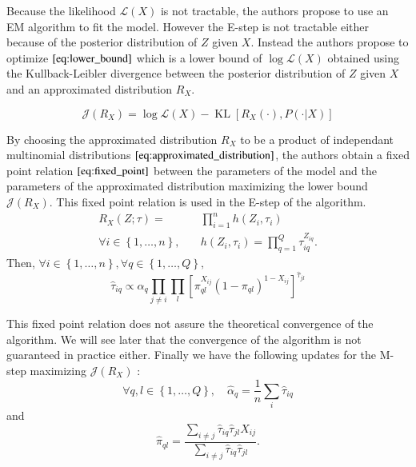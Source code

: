 \documentclass[switch, 12pt]{article}
\DeclareMathOperator*{\KL}{KL}
\begin{document}
\begin{multicols}{2}
    Because the likelihood $\mathcal{L}(X)$ is not tractable, the authors propose to use an EM algorithm to fit the model. However the E-step is not tractable either because of the posterior distribution of $Z$ given $X$. Instead the authors propose to optimize $\eqref{eq:lower_bound}$ which is a lower bound of $\log\mathcal{L}(X)$ obtained using the Kullback-Leibler divergence between the posterior distribution of $Z$ given $X$ and an approximated distribution $R_X$.

    \begin{equation}
        \label{eq:lower_bound}
        \mathcal{J}(R_X)=\log \mathcal{L}(X)-\KL[R_X(\cdot), P(\cdot|X)]
    \end{equation}

    By choosing the approximated distribution $R_X$ to be a product of independant multinomial distributions $\eqref{eq:approximated_distribution}$, the authors obtain a fixed point relation $\eqref{eq:fixed_point}$ between the parameters of the model and the parameters of the approximated distribution maximizing the lower bound $\mathcal{J}(R_X)$. This fixed point relation is used in the E-step of the algorithm.
    \begin{equation}
        \label{eq:approximated_distribution}
        \begin{aligned}
            R_X(Z; \tau)=                                 & \prod_{i=1}^n h(Z_i, \tau_i)                     \\
            \forall i \in \left\{1,\dots,n\right\}, \quad & h(Z_i, \tau_i)=\prod_{q=1}^Q \tau_{iq}^{Z_{iq}}.
        \end{aligned}
    \end{equation}
    Then, $\forall i \in \left\{1,\dots,n\right\}, \forall q \in \left\{1,\dots,Q\right\},$
    \begin{equation}
        \label{eq:fixed_point}
        \hat{\tau}_{iq}\propto \alpha_q \prod_{j\neq i}\prod_l \left[\pi_{ql}^{X_{ij}}(1-\pi_{ql})^{1-X_{ij}}\right]^{\hat{\tau}_{jl}}
    \end{equation}

    This fixed point relation does not assure the theoretical convergence of the algorithm. We will see later that the convergence of the algorithm is not guaranteed in practice either. Finally we have the following updates for the M-step maximizing $\mathcal{J}(R_X)$ :
    \begin{equation}
        \label{eq:m_step}
        \forall q, l \in \left\{1,\dots,Q\right\}, \quad
        \hat{\alpha}_q=\frac{1}{n}\sum_{i} \hat{\tau}_{iq}
    \end{equation}
    and
    \begin{equation}
        \hat{\pi}_{ql}=\frac{\sum_{i\neq j} \hat{\tau}_{iq}\hat{\tau}_{jl}X_{ij}}{\sum_{i\neq j} \hat{\tau}_{iq}\hat{\tau}_{jl}}.
    \end{equation}


\end{multicols}
\end{document}
